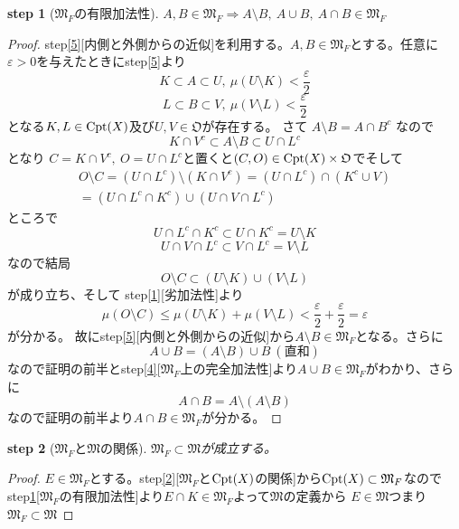 \documentclass[leqno]{jsarticle}
\newtheorem{stp}{{\bf step}}
\newcommand{\To}{\Longrightarrow}
\newcommand{\mm}{\mathfrak{M}}
\newcommand{\mf}{\mathfrak{M}_F}
\newcommand{\ep}{\varepsilon}
\newcommand{\cpt}{{\rm Cpt}(X)}
\newcommand{\oo}{\mathfrak{O}}
\begin{document}
\begin{stp}[$\mf$の有限加法性]\label{6}
$A,B\in\mf\To A\setminus B,\ A\cup B,\ A\cap B\in\mf$
\end{stp}
\begin{proof}step\ref{5}[内側と外側からの近似]を利用する。$A,B\in \mf$とする。任意に$\ep>0$を与えたときにstep\ref{5}より
\[
K\subset A\subset U,\ \mu(U\setminus K)<\frac{\ep}{2}
\]
\[
L\subset B\subset V,\ \mu(V\setminus L)<\frac{\ep}{2}
\]
となる$K,L\in\cpt$及び$U,V\in\oo$が存在する。
さて
$
A\setminus B=A\cap B^{c}
$
なので
\[
K\cap V^{c}\subset A\setminus B\subset U\cap L^{c}
\]
となり
$C=K\cap V^{c},\ O=U\cap L^{c}$と置くと$(C,O)\in \cpt\times \oo$でそして
\begin{eqnarray*}
O\setminus C=(U\cap L^{c})\setminus (K\cap V^{c})=(U\cap L^{c})\cap(K^{c}\cup V)\\ 
=(U\cap L^{c}\cap K^{c})\cup (U\cap V\cap L^{c})
\end{eqnarray*}
ところで
\[
U\cap L^{c}\cap K^{c}\subset U\cap K^{c}=U\setminus K
\]
\[
U\cap V\cap L^{c}\subset V\cap L^{c}=V\setminus L
\]
なので結局
\[
O\setminus C\subset (U\setminus K)\cup(V\setminus L)
\]
が成り立ち、そして
step\ref{1}[劣加法性]より
\[
\mu(O\setminus C)\le \mu(U\setminus K)+\mu(V\setminus L)<\frac{\ep}{2}+\frac{\ep}{2}=\ep
\]
が分かる。
故にstep\ref{5}[内側と外側からの近似]から$A\setminus B\in \mf$となる。さらに
\[
A\cup B=(A\setminus B)\cup B\ (直和)
\]
なので証明の前半とstep\ref{4}[$\mf$上の完全加法性]より$A\cup B\in \mf$がわかり、さらに
\[
A\cap B=A\setminus (A\setminus B)
\]
なので証明の前半より$A\cap B\in \mf$が分かる。
\end{proof}


\begin{stp}[$\mf$と$\mm$の関係]\label{7}
$\mf\subset\mm$が成立する。
\end{stp}
\begin{proof}
$E\in\mf$とする。step\ref{2}[$\mf$と$\cpt$の関係]から$\cpt\subset \mf$なのでstep\ref{6}[$\mf$の有限加法性]より$E\cap K\in \mf$よって$\mm$の定義から
$E\in \mm$つまり$\mf\subset \mm$
\end{proof}
\end{document}
